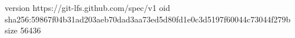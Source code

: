version https://git-lfs.github.com/spec/v1
oid sha256:59867f04b31ad203aeb70dad3aa73ed5d80fd1e0c3d5197f60044c73044f279b
size 56436

